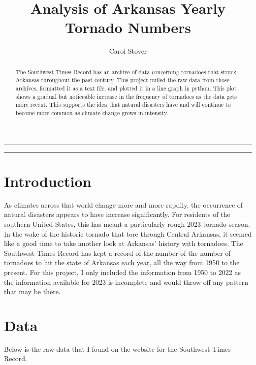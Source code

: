 \documentclass[12 pt., oneside, letterpaper]{article}
\title{\HUGE Analysis of Arkansas Yearly Tornado Numbers}
\author{\Large Carol Stover}
\begin{document}
\hrule{\textwidth}
\begin{abstract}
    \noindent The Southwest Times Record has an archive of data concerning tornadoes that struck Arkansas throughout the past century. This project pulled the raw data from those archives, formatted it as a text file, and plotted it in a line graph in python. This plot shows a gradual but noticeable increase in the frequency of tornadoes as the data gets more recent. This supports the idea that natural disasters have and will continue to become more common as climate change grows in intensity.  
\end{abstract}
\hrule{\textwidth}


\section{Introduction}

As climates across that world change more and more rapdily, the occurrence of natural disasters appears to have increase significantly. For residents of the southern United States,
this has meant a particularly rough 2023 tornado season. In the wake of the historic tornado that tore through Central Arkansas, it seemed like a good time to take another look at Arkansas' history with
tornadoes. The Southwest Times Record has kept a record of the number of the number of tornadoes to hit the state of Arkansas each year, all the way from 1950 to the present. For this project, I only included the information from 1950 to 2022 as the information available for 2023 is incomplete and would throw off any pattern that may be there. 
 



\section{Data}
Below is the raw data that I found on the website for the Southwest Times Record.



 
\newpage
\end{document}
